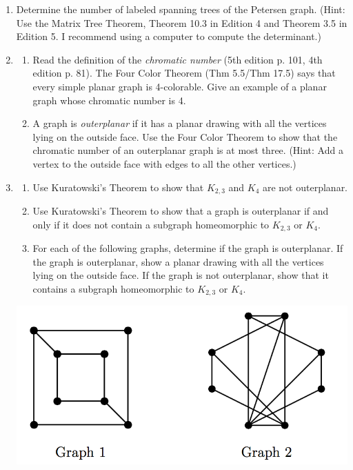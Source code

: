 \documentclass{article}
\begin{document}
\begin{enumerate}

\item Determine the number of labeled spanning trees of the Petersen graph. (Hint: Use the Matrix Tree Theorem, Theorem 10.3 in Edition 4 and Theorem 3.5 in Edition 5. I recommend using a computer to compute the determinant.)

\item 
\begin{enumerate}
	\item Read the definition of the {\it chromatic number} (5th edition p. 101, 4th edition p. 81). The Four Color Theorem (Thm 5.5/Thm 17.5) says that every simple planar graph is 4-colorable. Give an example of a planar graph whose chromatic number is 4.
	
	\item A graph is {\it outerplanar} if it has a planar drawing with all the vertices lying on the outside face. Use the Four Color Theorem to show that the chromatic number of an outerplanar graph is at most three. (Hint: Add a vertex to the outside face with edges to all the other vertices.)
\end{enumerate}

\item \begin{enumerate}
	\item Use Kuratowski's Theorem to show that $K_{2,3}$ and $K_4$ are not outerplanar.

	\item Use Kuratowski's Theorem to show that a graph is outerplanar if and only if it does not contain a subgraph homeomorphic to $K_{2,3}$ or $K_4$.

	\item For each of the following graphs, determine if the graph is outerplanar. If the graph is outerplanar, show a planar drawing with all the vertices lying on the outside face. If the graph is not outerplanar, show that it contains a subgraph homeomorphic to $K_{2,3}$ or $K_4$.
\end{enumerate}

\begin{center}
\includegraphics[width=.5\textwidth]{pic1.png}	
\end{center}



\end{enumerate}
\end{document}
